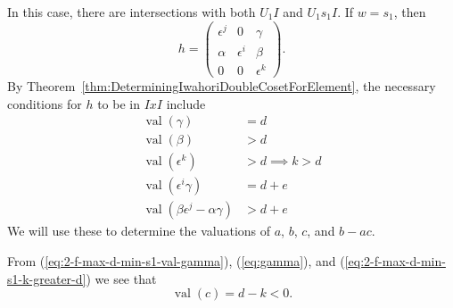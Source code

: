 \documentclass{amsart}
\theoremstyle{definition}
\def\e{\epsilon}
\def\val{\mathop{\mathrm{val}}}
\begin{document}
  In this case, there are intersections with both $U_1 I$ and $U_1 s_1 I$.  If
  $w = s_1$, then
  \begin{equation*}
    h = \begin{pmatrix}
      \e^j & 0 & \gamma \\
      \alpha & \e^i & \beta \\
      0 & 0 & \e^k
    \end{pmatrix}.
  \end{equation*}
  By Theorem~\ref{thm:DeterminingIwahoriDoubleCosetForElement}, the necessary
  conditions for $h$ to be in $IxI$ include
  \begin{align}
    \label{eq:2-f-max-d-min-s1-val-gamma}
    \val(\gamma) &= d \\
    \label{eq:2-f-max-d-min-s1-val-beta}
    \val(\beta) &> d \\
    \label{eq:2-f-max-d-min-s1-k-greater-d}
    \val(\e^k) &> d \implies k > d \\
    \label{eq:2-f-max-d-min-s1-minor-equality}
    \val(\e^i\gamma) &= d + e \\
    \label{eq:2-f-max-d-min-s1-val-minor}
    \val(\beta\e^j - \alpha\gamma) &> d + e
  \end{align}
  We will use these to determine the valuations of $a$, $b$, $c$, and $b-ac$.

  From (\ref{eq:2-f-max-d-min-s1-val-gamma}), (\ref{eq:gamma}), and
  (\ref{eq:2-f-max-d-min-s1-k-greater-d}) we see that
  \begin{equation}
    \label{eq:2-f-max-d-min-s1-val-c}
    \val(c) = d - k < 0.
  \end{equation}
\end{document}
